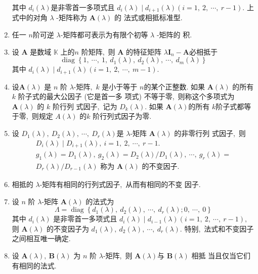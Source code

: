 \begin{enumerate}
		其中 $ d_{i}(\lambda)  $是非零首一多项式且 $ d_{i}(\lambda) \mid d_{i+1}(\lambda)(i=   1,\ 2,\  \cdots,\  r-1) .$ 上式中的对角 $ \lambda$ -矩阵称为  $\boldsymbol{A}(\lambda)$  的 法式或相抵标准型.
		\item 任一 $ n  $阶可逆 $ \lambda $-矩阵都可表示为有限个初等  $\lambda$ -矩阵的 积.
		\item 设  $\boldsymbol{A}$  是数域  $\mathbb{K} $ 上的$  n$  阶矩阵,\  则  $\boldsymbol{A}$  的特征矩阵  $\lambda \boldsymbol{I}_{n}-\boldsymbol{A}  $必相抵于
		$$\operatorname{diag}\left\{1,\  \cdots,\  1,\  d_{1}(\lambda),\  d_{2}(\lambda),\  \cdots,\  d_{m}(\lambda)\right\}$$
		其中 $ d_{i}(\lambda) \mid d_{i+1}(\lambda)(i=1,\ 2,\  \cdots,\  m-1) .$
		\item 设$  \boldsymbol{A}(\lambda)$ 是 $ n $ 阶  $\lambda $-矩阵,\  $ k$  是小于等于 $ n  $的某个正整数. 如果  $\boldsymbol{A}(\lambda) $ 的所有  $k$  阶子式的最大公因子 (它是首一多 项式) 不等于零,\  则称这个多项式为  $\boldsymbol{A}(\lambda) $ 的  $k$  阶行列 式因子,\  记为 $ D_{k}(\lambda) .$ 如果  $\boldsymbol{A}(\lambda)  $的所有 $ k  $阶子式都等于零,\  则规定  $A(\lambda) $ 的$  k$  阶行列式因子为零.
		\item 设  $D_{1}(\lambda),\  D_{2}(\lambda),\  \cdots,\  D_{r}(\lambda)  $是  $\lambda $-矩阵 $ \boldsymbol{A}(\lambda)$  的非零行列 式因子,\  则
		$$\begin{array}{l}
			D_{i}(\lambda) \mid D_{i+1}(\lambda),\  i=1,\ 2,\  \cdots,\  r-1 . \\
			g_{1}(\lambda)=D_{1}(\lambda),\  g_{2}(\lambda)=D_{2}(\lambda) / D_{1}(\lambda),\  \cdots,\  g_{r}(\lambda)= \\
			D_{r}(\lambda) / D_{r-1}(\lambda) \text { 称为 } \boldsymbol{A}(\lambda) \text { 的不变因子. }
		\end{array}$$
		\item 相抵的 $ \lambda $-矩阵有相同的行列式因子,\  从而有相同的不变 因子.
		\item 设  $n $ 阶  $\lambda $-矩阵  $\boldsymbol{A}(\lambda) $ 的法式为
		$$\Lambda=\operatorname{diag}\left\{d_{1}(\lambda),\  d_{2}(\lambda),\  \cdots,\  d_{r}(\lambda) ; 0,\  \cdots,\  0\right\}$$
		其中  $d_{i}(\lambda) $ 是非零首一多项式且  $d_{i}(\lambda) \mid d_{i-1}(\lambda)(i=1 ,\   2,\  \cdots,\  r-1) ,\ $ 则 $\boldsymbol{A}(\lambda) $ 的不变因子为 $ d_{1}(\lambda),\  d_{2}(\lambda),\  \cdots ,\   d_{r}(\lambda) .$ 特别,\  法式和不变因子之间相互唯一确定.
		\item 设 $ \boldsymbol{A}(\lambda),\  \boldsymbol{B}(\lambda)$  为 $ n$  阶 $\lambda $-矩阵,\  则  $\boldsymbol{A}(\lambda)  $与  $\boldsymbol{B}(\lambda) $ 相抵 当且仅当它们有相同的法式.

\end{enumerate}
